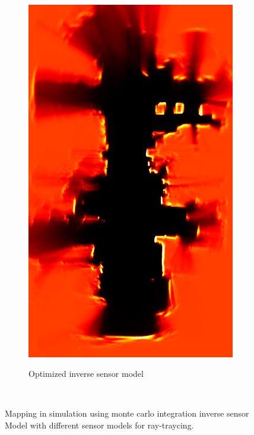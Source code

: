 \begin{figure}[tbph]
\begin{subfigure}[b]{0.45\textwidth}
		\includegraphics[width=1.0\textwidth]{figures/static_mapping/monte_carlo_map_optimized}		
		\label{fig:particle_shot-croped}
		\caption{Optimized inverse sensor model}
	\end{subfigure}
	~ %
	\caption{Mapping in simulation using monte carlo integration inverse sensor Model with different sensor models for ray-traycing.}
\end{figure}

